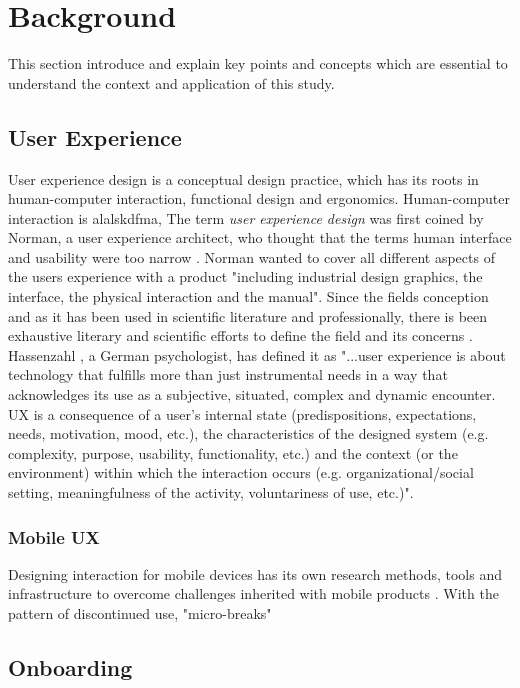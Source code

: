 \chapter{Background}
\label{chap:background}
This section introduce and explain key points and concepts which are essential to understand the context and application of this study.

\section{User Experience}
User experience design is a conceptual design practice, which has its roots in human-computer interaction, functional design and ergonomics. Human-computer interaction is alalskdfma, The term \textit{user experience design} was first coined by Norman, a user experience architect, who thought that the terms human interface and usability were too narrow \cite{Merholz2008}. Norman wanted to cover all different aspects of the users experience with a product "including industrial design graphics, the interface, the physical interaction and the manual". Since the fields conception and as it has been used in scientific literature and professionally, there is been exhaustive literary and scientific efforts to define the field and its concerns \cite{Law2008} \cite{Law2009} \cite{Forlizzi2000}. Hassenzahl \cite{Hassenzahl2006}, a German psychologist, has defined it as "...user experience is about technology that fulfills more than just instrumental needs in a way that acknowledges its use as a subjective, situated, complex and dynamic encounter. UX is a consequence of a user’s internal state (predispositions, expectations, needs, motivation, mood, etc.), the characteristics of the designed system (e.g. complexity, purpose, usability, functionality, etc.) and the context (or the environment) within which the interaction occurs (e.g. organizational/social setting, meaningfulness of the activity, voluntariness of use, etc.)".

\subsection{Mobile UX}
Designing interaction for mobile devices has its own research methods, tools and infrastructure to overcome challenges inherited with mobile products \cite{Nakhimovsky2009}. With the pattern of discontinued use, "micro-breaks" \cite{McGregor2014a}
\section{Onboarding}

